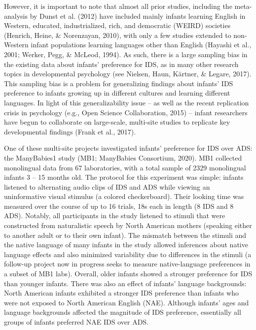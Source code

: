 \documentclass[
  english,
  ,man,floatsintext]{apa6}
\begin{document}
However, it is important to note that almost all prior studies, including the meta-analysis by Dunst et al. (2012) have included mainly infants learning English in Western, educated, industrialized, rich, and democratic (WEIRD) societies (Henrich, Heine, \& Norenzayan, 2010), with only a few studies extended to non-Western infant populations learning languages other than English (Hayashi et al., 2001; Werker, Pegg, \& McLeod, 1994). As such, there is a large sampling bias in the existing data about infants' preference for IDS, as in many other research topics in developmental psychology (see Nielsen, Haun, Kärtner, \& Legare, 2017). This sampling bias is a problem for generalizing findings about infants' IDS preference to infants growing up in different cultures and learning different languages. In light of this generalizability issue -- as well as the recent replication crisis in psychology (e.g., Open Science Collaboration, 2015) -- infant researchers have begun to collaborate on large-scale, multi-site studies to replicate key developmental findings (Frank et al., 2017).

One of these multi-site projects investigated infants' preference for IDS over ADS: the ManyBabies1 study (MB1; ManyBabies Consortium, 2020). MB1 collected monolingual data from 67 laboratories, with a total sample of 2329 monolingual infants 3 -- 15 months old. The protocol for this experiment was simple: infants listened to alternating audio clips of IDS and ADS while viewing an uninformative visual stimulus (a colored checkerboard). Their looking time was measured over the course of up to 16 trials, 18s each in length (8 IDS and 8 ADS). Notably, all participants in the study listened to stimuli that were constructed from naturalistic speech by North American mothers (speaking either to another adult or to their own infant). The mismatch between the stimuli and the native language of many infants in the study allowed inferences about native language effects and also minimized variability due to differences in the stimuli (a follow-up project now in progress seeks to measure native-language preferences in a subset of MB1 labs). Overall, older infants showed a stronger preference for IDS than younger infants. There was also an effect of infants' language backgrounds: North American infants exhibited a stronger IDS preference than infants who were not exposed to North American English (NAE). Although infants' ages and language backgrounds affected the magnitude of IDS preference, essentially all groups of infants preferred NAE IDS over ADS.
\end{document}
